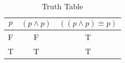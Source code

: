 \begin{table}[ht]
\caption{Truth Table}
\centering
\begin{tabular}{|c||c|c|}
\hline
$ p $ & $ (p \wedge p) $ & $ ((p \wedge p) \equiv p) $ \\
\hline
F & F & T \\
T & T & T \\
\hline
\end{tabular}
\label{table:tt1}
\end{table}
